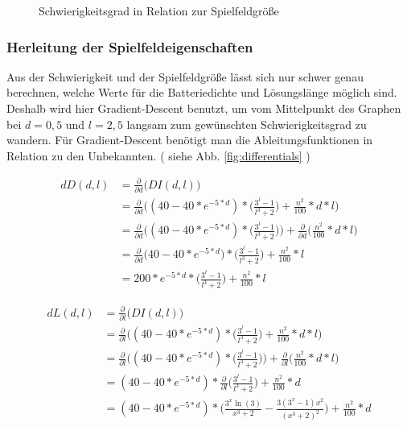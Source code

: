 \documentclass[a4paper,10pt,ngerman]{scrartcl}
\newcommand{\abbref}[1]{
  siehe Abb. \ref{#1}
}
\begin{document}
\begin{figure}[ht]
  \centering
  \caption{Schwierigkeitsgrad in Relation zur Spielfeldgröße}
  \label{fig:sizefundtion}
\end{figure}

\subsubsection{Herleitung der Spielfeldeigenschaften}
Aus der Schwierigkeit und der Spielfeldgröße lässt sich nur schwer genau berechnen, welche Werte für die Batteriedichte und Lösungslänge möglich sind.
Deshalb wird hier Gradient-Descent benutzt, um vom Mittelpunkt des Graphen bei $d = 0,5$ und $l = 2,5$ langsam zum gewünschten Schwierigkeitsgrad zu wandern.
Für Gradient-Descent benötigt man die Ableitungsfunktionen in Relation zu den Unbekannten. (\abbref{fig:differentials})

\begin{align*}
  dD(d,l) &= \frac{\partial}{\partial d}\bigg(DI(d,l)\bigg)\\
  &= \frac{\partial}{\partial d}\bigg((40 - 40 * e^{-5 * d}) * \bigg(\frac{3^{l} - 1}{l^{3} + 2}\bigg) + \frac{n^{2}}{100} * d * l\bigg)\\
  &= \frac{\partial}{\partial d}\bigg((40 - 40 * e^{-5 * d}) * \bigg(\frac{3^{l} - 1}{l^{3} + 2}\bigg)\bigg) + \frac{\partial}{\partial d}\bigg(\frac{n^{2}}{100} * d * l\bigg)\\
  &= \frac{\partial}{\partial d}\bigg(40 - 40 * e^{-5 * d}\bigg) * \bigg(\frac{3^{l} - 1}{l^{3} + 2}\bigg) + \frac{n^{2}}{100} * l\\
  &= 200 * e^{-5 * d} * \bigg(\frac{3^{l} - 1}{l^{3} + 2}\bigg) + \frac{n^{2}}{100} * l
\end{align*}

\begin{align*}
  dL(d,l) &= \frac{\partial}{\partial l}\bigg(DI(d,l)\bigg)\\
  &= \frac{\partial}{\partial l}\bigg((40 - 40 * e^{-5 * d}) * \bigg(\frac{3^{l} - 1}{l^{3} + 2}\bigg) + \frac{n^{2}}{100} * d * l\bigg)\\
  &= \frac{\partial}{\partial l}\bigg((40 - 40 * e^{-5 * d}) * \bigg(\frac{3^{l} - 1}{l^{3} + 2}\bigg)\bigg) + \frac{\partial}{\partial l}\bigg(\frac{n^{2}}{100} * d * l\bigg)\\
  &= (40 - 40 * e^{-5 * d}) * \frac{\partial}{\partial l}\bigg(\frac{3^{l} - 1}{l^{3} + 2}\bigg) + \frac{n^{2}}{100} * d\\
  &= (40 - 40 * e^{-5 * d}) * \bigg(\frac{3^{x} \ln{(3)}}{x^{3} + 2} - \frac{3(3^{x} - 1)x^{2}}{(x^{3} + 2)^{2}}\bigg) + \frac{n^{2}}{100} * d\\
\end{align*}
\end{document}
